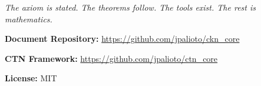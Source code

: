 \documentclass[11pt]{article}
\theoremstyle{definition}
\theoremstyle{remark}
\begin{document}
\vspace{2em}
\begin{center}
\emph{The axiom is stated. The theorems follow. The tools exist. The rest is mathematics.}
\end{center}

\vspace{1.5em}

\noindent\textbf{Document Repository:} \url{https://github.com/jpalioto/ckn_core}

\noindent\textbf{CTN Framework:} \url{https://github.com/jpalioto/ctn_core}

\noindent\textbf{License:} MIT
\end{document}
